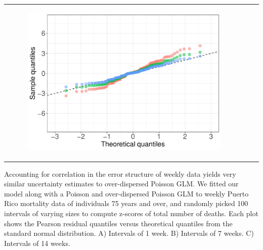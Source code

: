 \documentclass[11pt]{article}
\begin{document}
\begin{suppfigure}[ht]
\begin{tabular}{lll}
\begin{subfigure}[t]{0.30\linewidth}
		\includegraphics[width=1\linewidth]{figs/supp-figure-9c.pdf}
	\end{subfigure}\\
    \end{tabular}
    \caption{Accounting for correlation in the error structure of weekly data yields very similar uncertainty estimates to over-dispersed Poisson GLM. We fitted our model along with a Poisson and over-dispersed Poisson GLM to weekly Puerto Rico mortality data of individuals 75 years and over, and randomly picked 100 intervals of varying sizes to compute z-scores of total number of deaths. Each plot shows the Pearson residual quantiles versus theoretical quantiles from the standard normal distribution. A) Intervals of 1 week. B) Intervals of 7 weeks. C) Intervals of 14 weeks.}
    \label{supp-fig:weekly-correlated}
\end{suppfigure}
\end{document}
